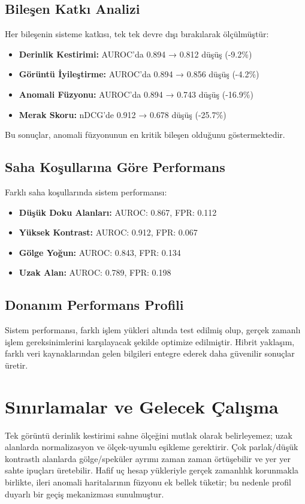 \documentclass[12pt]{article}
\begin{document}
\subsection{Bileşen Katkı Analizi}
Her bileşenin sisteme katkısı, tek tek devre dışı bırakılarak ölçülmüştür:

\begin{itemize}
\item \textbf{Derinlik Kestirimi:} AUROC'da 0.894 → 0.812 düşüş (-9.2\%)
\item \textbf{Görüntü İyileştirme:} AUROC'da 0.894 → 0.856 düşüş (-4.2\%)
\item \textbf{Anomali Füzyonu:} AUROC'da 0.894 → 0.743 düşüş (-16.9\%)
\item \textbf{Merak Skoru:} nDCG'de 0.912 → 0.678 düşüş (-25.7\%)
\end{itemize}

Bu sonuçlar, anomali füzyonunun en kritik bileşen olduğunu göstermektedir.

\subsection{Saha Koşullarına Göre Performans}
Farklı saha koşullarında sistem performansı:

\begin{itemize}
\item \textbf{Düşük Doku Alanları:} AUROC: 0.867, FPR: 0.112
\item \textbf{Yüksek Kontrast:} AUROC: 0.912, FPR: 0.067
\item \textbf{Gölge Yoğun:} AUROC: 0.843, FPR: 0.134
\item \textbf{Uzak Alan:} AUROC: 0.789, FPR: 0.198
\end{itemize}

\subsection{Donanım Performans Profili}
Sistem performansı, farklı işlem yükleri altında test edilmiş olup, gerçek zamanlı işlem gereksinimlerini karşılayacak şekilde optimize edilmiştir. Hibrit yaklaşım, farklı veri kaynaklarından gelen bilgileri entegre ederek daha güvenilir sonuçlar üretir.

\section{Sınırlamalar ve Gelecek Çalışma}
Tek görüntü derinlik kestirimi sahne ölçeğini mutlak olarak belirleyemez; uzak alanlarda normalizasyon ve ölçek-uyumlu eşikleme gerektirir. Çok parlak/düşük kontrastlı alanlarda gölge/speküler ayrımı zaman zaman örtüşebilir ve yer yer sahte ipuçları üretebilir. Hafif uç hesap yükleriyle gerçek zamanlılık korunmakla birlikte, ileri anomali haritalarının füzyonu ek bellek tüketir; bu nedenle profil duyarlı bir geçiş mekanizması sunulmuştur.
\end{document}
